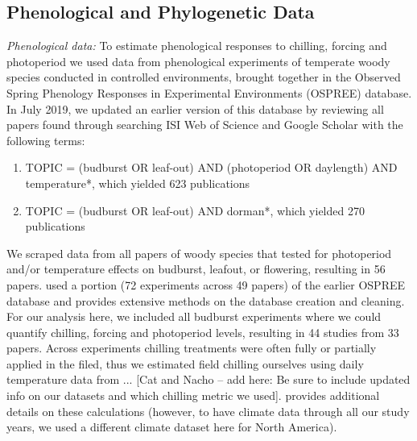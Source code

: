 \documentclass{article}\usepackage[]{graphicx}\usepackage[]{color}
\begin{document}
\subsection*{Phenological and Phylogenetic Data}
\emph{Phenological data:} To estimate phenological responses to chilling, forcing and photoperiod we used data from phenological experiments of temperate woody species conducted in controlled environments, brought together in the Observed Spring Phenology Responses in Experimental Environments (OSPREE) database. In July 2019, we updated an earlier version of this database \citep{wolkovich2019} by reviewing all papers found through searching ISI Web of Science and Google Scholar with the following terms: 
\begin{enumerate}
\item TOPIC = (budburst OR leaf-out) AND (photoperiod OR daylength) AND temperature*, which yielded 623 publications
\item TOPIC = (budburst OR leaf-out) AND dorman*, which yielded 270 publications
\end{enumerate}
We scraped data from all papers of woody species that tested for photoperiod and/or temperature effects on budburst, leafout, or flowering, resulting in 56 papers. \citet{ospreebbms} used a portion (72 experiments across 49 papers) of the earlier OSPREE database and provides extensive methods on the database creation and cleaning. For our analysis here, we included all budburst experiments where we could quantify chilling, forcing and photoperiod levels, resulting in 44 studies from 33 papers. 
Across experiments chilling treatments were often fully or partially applied in the filed, thus we estimated field chilling ourselves using daily temperature data from ... [Cat and Nacho -- add here: Be sure to include updated info on our datasets and which chilling metric we used]. \citet{ospreebbms} provides additional details on these calculations (however, to have climate data through all our study years, we used a different climate dataset here for North America).\\ 
\end{document}

